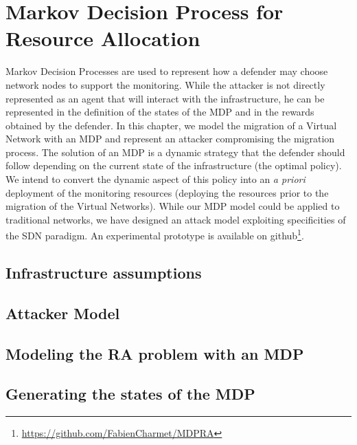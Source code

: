 \section{Markov Decision Process for Resource Allocation}

Markov Decision Processes are used to represent how a defender may choose network nodes to support the monitoring.
While the attacker is not directly represented as an agent that will interact with the infrastructure, he can be represented in the definition of the states of the MDP and in the rewards obtained by the defender.
In this chapter, we model the migration of a Virtual Network with an MDP and represent an attacker compromising the migration process.
The solution of an MDP is a dynamic strategy that the defender should follow depending on the current state of the infrastructure (\ie the optimal policy).
We intend to convert the dynamic aspect of this policy into an \textit{a priori} deployment of the monitoring resources (\ie deploying the resources prior to the migration of the Virtual Networks).
While our MDP model could be applied to traditional networks, we have designed an attack model exploiting specificities of the SDN paradigm. 
An experimental prototype is available on github\footnote{\label{github}\url{https://github.com/FabienCharmet/MDPRA}}.



% 



\subsection{Infrastructure assumptions}



\subsection{Attacker Model}


\subsection{Modeling the RA problem with an MDP}


\newpage
\subsection{Generating the states of the MDP}
 

